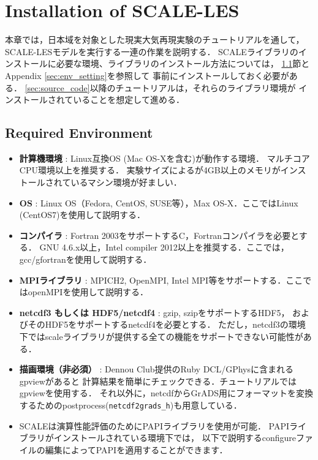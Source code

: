 \section{Installation of SCALE-LES}

本章では，日本域を対象とした現実大気再現実験のチュートリアルを通して，
SCALE-LESモデルを実行する一連の作業を説明する．
SCALEライブラリのインストールに必要な環境、ライブラリのインストール方法については，
\ref{sec:req_env}節とAppendix \ref{sec:env_setting}を参照して
事前にインストールしておく必要がある．
\ref{sec:source_code}以降のチュートリアルは，それらのライブラリ環境が
インストールされていることを想定して進める．


\subsection{Required Environment}
\label{sec:req_env}

\begin{itemize}
  \item {\bf 計算機環境} : Linux互換OS (Mac OS-Xを含む)が動作する環境．
        マルチコアCPU環境以上を推奨する．
        実験サイズによるが4GB以上のメモリがインストールされているマシン環境が好ましい．
  \item {\bf OS} : Linux OS（Fedora, CentOS, SUSE等），Max OS-X．ここではLinux (CentOS7)を使用して説明する．
  \item {\bf コンパイラ} : Fortran 2003をサポートするC，Fortranコンパイラを必要とする．
        GNU 4.6.x以上，Intel compiler 2012以上を推奨する．ここでは，gcc/gfortranを使用して説明する．
  \item {\bf MPIライブラリ} : MPICH2, OpenMPI, Intel MPI等をサポートする．ここではopenMPIを使用して説明する．
  \item {\bf netcdf3 もしくは HDF5/netcdf4} : gzip, szipをサポートするHDF5，
        およびそのHDF5をサポートするnetcdf4を必要とする．
        ただし，netcdf3の環境下ではscaleライブラリが提供する全ての機能をサポートできない可能性がある．
  \item {\bf 描画環境（非必須）} : Dennou Club提供のRuby DCL/GPhysに含まれるgpviewがあると
        計算結果を簡単にチェックできる．チュートリアルではgpviewを使用する．
        それ以外に，netcdfからGrADS用にフォーマットを変換するためのpostprocess(\verb|netcdf2grads_h|)も用意している．
  \item SCALEは演算性能評価のためにPAPIライブラリを使用が可能．
        PAPIライブラリがインストールされている環境下では，
        以下で説明するconfigureファイルの編集によってPAPIを適用することができます．
\end{itemize}


